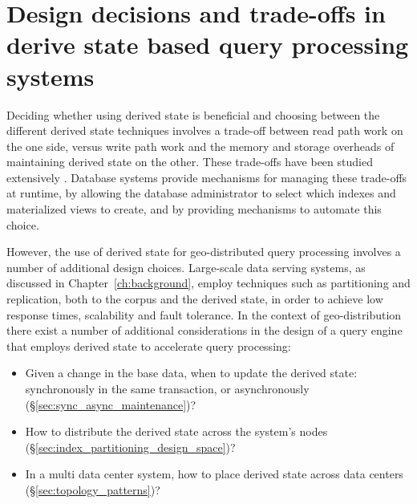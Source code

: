 \section{Design decisions and trade-offs in derive state based query processing systems}

Deciding whether using derived state is beneficial and choosing between the different derived state techniques
involves a trade-off between read path work on the one side,
versus write path work and the memory and storage overheads of maintaining derived state on the other.
These trade-offs have been studied extensively \cite{valentin:db2advisor, chaudhuri:decadeselftuning}.
Database systems provide mechanisms for managing these trade-offs at runtime, by allowing the database administrator
to select which indexes and materialized views to create, and by providing mechanisms to automate this choice.

However, the use of derived state for geo-distributed query processing involves a number of additional design choices.
Large-scale data serving systems, as discussed in Chapter~\ref{ch:background}, employ techniques such as partitioning and
replication, both to the corpus and the derived state, in order to achieve low response times, scalability and
fault tolerance.
In the context of geo-distribution there exist a number of additional considerations in the design of a query engine
that employs derived state to accelerate query processing:


\begin{itemize}

  \item Given a change in the base data, when to update the derived state:
  synchronously in the same transaction, or asynchronously (\S\ref{sec:sync_async_maintenance})?

  \item How to distribute the derived state across the system's nodes (\S\ref{sec:index_partitioning_design_space})?

  \item In a multi data center system, how to place derived state across data centers (\S\ref{sec:topology_patterns})?


\end{itemize}

